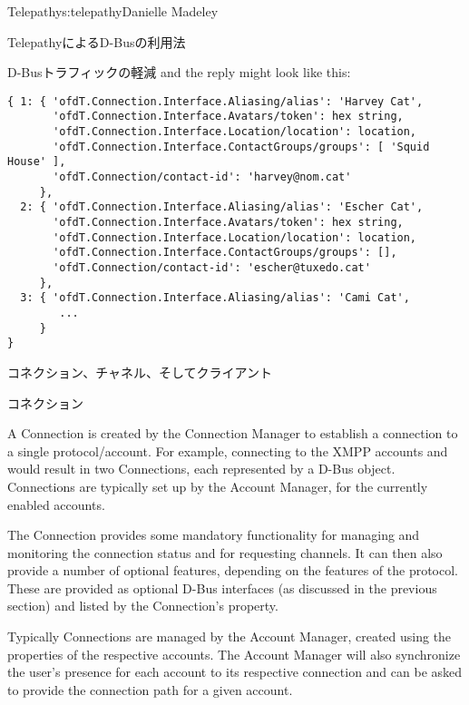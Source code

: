 \begin{aosachapter}{Telepathy}{s:telepathy}{Danielle Madeley}
\begin{aosasect1}{TelepathyによるD-Busの利用法}
\begin{aosasect2}{D-Busトラフィックの軽減}
\noindent and the reply might look like this:

\begin{verbatim}
{ 1: { 'ofdT.Connection.Interface.Aliasing/alias': 'Harvey Cat',
       'ofdT.Connection.Interface.Avatars/token': hex string,
       'ofdT.Connection.Interface.Location/location': location,
       'ofdT.Connection.Interface.ContactGroups/groups': [ 'Squid House' ],
       'ofdT.Connection/contact-id': 'harvey@nom.cat'
     },
  2: { 'ofdT.Connection.Interface.Aliasing/alias': 'Escher Cat',
       'ofdT.Connection.Interface.Avatars/token': hex string,
       'ofdT.Connection.Interface.Location/location': location,
       'ofdT.Connection.Interface.ContactGroups/groups': [],
       'ofdT.Connection/contact-id': 'escher@tuxedo.cat'
     },
  3: { 'ofdT.Connection.Interface.Aliasing/alias': 'Cami Cat',
        ...
     }
}
\end{verbatim}

\end{aosasect2}

\end{aosasect1}

\begin{aosasect1}{コネクション、チャネル、そしてクライアント}
\label{sec.telepathy.ccc}

\begin{aosasect2}{コネクション}

A Connection is created by the Connection Manager to establish a
connection to a single protocol/account. For example, connecting to
the XMPP accounts  and 
would result in two Connections, each represented by a D-Bus
object. Connections are typically set up by the Account Manager, for
the currently enabled accounts.

The Connection provides some mandatory functionality for managing and
monitoring the connection status and for requesting channels. It can
then also provide a number of optional features, depending on the
features of the protocol. These are provided as optional D-Bus
interfaces (as discussed in the previous section) and listed by the
Connection's  property.

Typically Connections are managed by the Account Manager, created
using the properties of the respective accounts. The Account Manager
will also synchronize the user's presence for each account to its
respective connection and can be asked to provide the connection path
for a given account.


\end{aosasect2}
\end{aosasect1}
\end{aosachapter}
